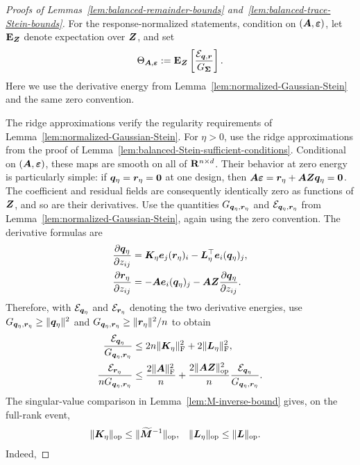 \documentclass{article}
\theoremstyle{plain} %
\theoremstyle{definition} %
\theoremstyle{definition} %
\begin{document}
\begin{proof}[Proofs of Lemmas~\ref{lem:balanced-remainder-bounds}
and~\ref{lem:balanced-trace-Stein-bounds}]
For the response-normalized statements, condition on
$(\boldsymbol{A},{\boldsymbol{\varepsilon} })$, let ${\mathbf{E}}_{\boldsymbol{Z}}$ denote expectation over $\boldsymbol{Z}$, and set
\begin{align*}
    \Theta_{\boldsymbol{A},{\boldsymbol{\varepsilon} }}
    :={\mathbf{E}}_{\boldsymbol{Z}}\left[\frac{{\mathcal E}_{\boldsymbol{q},\boldsymbol{r}}}{G_{\boldsymbol{\Sigma}}}\right].
\end{align*}
Here we use the derivative energy from
Lemma~\ref{lem:normalized-Gaussian-Stein} and the same zero convention.

The ridge approximations verify the regularity requirements of
Lemma~\ref{lem:normalized-Gaussian-Stein}. For $\eta>0$, use the ridge
approximations from the proof of
Lemma~\ref{lem:balanced-Stein-sufficient-conditions}.
Conditional on $(\boldsymbol{A},{\boldsymbol{\varepsilon} })$, these maps are smooth on all of
${\mathbf{R}}^{n\times d}$. Their behavior at zero energy is particularly simple: if
$\boldsymbol{q}_\eta=\boldsymbol{r}_\eta=\mathbf{0}$ at one design, then
$\boldsymbol{A}{\boldsymbol{\varepsilon} }=\boldsymbol{r}_\eta+\boldsymbol{A}\boldsymbol{Z}\boldsymbol{q}_\eta=\mathbf{0}$. The coefficient and residual
fields are consequently identically zero as functions of $\boldsymbol{Z}$, and so are
their derivatives. Use the quantities
$G_{\boldsymbol{q}_\eta,\boldsymbol{r}_\eta}$ and ${\mathcal E}_{\boldsymbol{q}_\eta,\boldsymbol{r}_\eta}$ from
Lemma~\ref{lem:normalized-Gaussian-Stein}, again using the zero convention.
The derivative formulas are
\begin{align*}
    \pdv{\boldsymbol{q}_\eta}{z_{ij}}
    &=\boldsymbol{K}_\eta\boldsymbol{e}_j(\boldsymbol{r}_\eta)_i
      -\boldsymbol{L}_\eta^\top\boldsymbol{e}_i(\boldsymbol{q}_\eta)_j,\\
    \pdv{\boldsymbol{r}_\eta}{z_{ij}}
    &=-\boldsymbol{A}\boldsymbol{e}_i(\boldsymbol{q}_\eta)_j
      -\boldsymbol{A}\boldsymbol{Z}\pdv{\boldsymbol{q}_\eta}{z_{ij}}.
\end{align*}
Therefore, with ${\mathcal E}_{\boldsymbol{q}_\eta}$ and ${\mathcal E}_{\boldsymbol{r}_\eta}$ denoting the two
derivative energies, use
$G_{\boldsymbol{q}_\eta,\boldsymbol{r}_\eta}\geq\lVert\boldsymbol{q}_\eta\rVert^2$ and
$G_{\boldsymbol{q}_\eta,\boldsymbol{r}_\eta}\geq\lVert\boldsymbol{r}_\eta\rVert^2/n$ to obtain
\begin{align*}
    \frac{{\mathcal E}_{\boldsymbol{q}_\eta}}{G_{\boldsymbol{q}_\eta,\boldsymbol{r}_\eta}}
    &\leq 2n\lVert\boldsymbol{K}_\eta\rVert_{\rm F}^2
       +2\lVert\boldsymbol{L}_\eta\rVert_{\rm F}^2,\\
    \frac{{\mathcal E}_{\boldsymbol{r}_\eta}}{nG_{\boldsymbol{q}_\eta,\boldsymbol{r}_\eta}}
    &\leq \frac{2\lVert\boldsymbol{A}\rVert_{\rm F}^2}{n}
       +\frac{2\lVert\boldsymbol{A}\boldsymbol{Z}\rVert_{\rm op}^2}{n}
          \frac{{\mathcal E}_{\boldsymbol{q}_\eta}}{G_{\boldsymbol{q}_\eta,\boldsymbol{r}_\eta}}.
\end{align*}
The singular-value comparison in
Lemma~\ref{lem:M-inverse-bound} gives, on the full-rank event,
\begin{align*}
    \lVert\boldsymbol{K}_\eta\rVert_{\rm op}
       &\leq\lVert\widetilde{\boldsymbol{M}}^{-1}\rVert_{\rm op},
    &
    \lVert\boldsymbol{L}_\eta\rVert_{\rm op}
       &\leq\lVert\boldsymbol{L}\rVert_{\rm op}.
\end{align*}
Indeed,

\end{proof}
\end{document}
